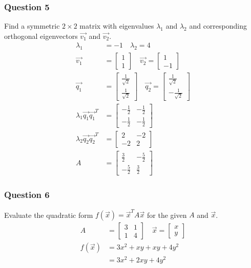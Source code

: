 \documentclass{math}
\begin{document}
\subsubsection*{Question 5}
Find a symmetric \( 2\times2 \) matrix with eigenvalues \( \lambda_1 \) and
\( \lambda_2 \) and corresponding orthogonal eigenvectors \( \vec{v_1} \) and
\( \vec{v_2} \).
\begin{align*}
  \lambda_1 &= -1 \quad \lambda_2 = 4 \\
  \vec{v_1} &= \begin{bmatrix}1 \\ 1\end{bmatrix} \quad
    \vec{v_2} = \begin{bmatrix}1 \\ -1\end{bmatrix} \\
  \vec{q_1} &= \begin{bmatrix}
    \frac{1}{\sqrt{2}} \\ \frac{1}{\sqrt{2}}
  \end{bmatrix} \quad \vec{q_2} = \begin{bmatrix}
    \frac{1}{\sqrt{2}} \\ -\frac{1}{\sqrt{2}}
  \end{bmatrix} \\
  \lambda_1\vec{q_1}\vec{q_1}^T &= \begin{bmatrix}
    -\frac{1}{2} & -\frac{1}{2} \\ -\frac{1}{2} & -\frac{1}{2}
  \end{bmatrix} \\
  \lambda_2\vec{q_2}\vec{q_2}^T &= \begin{bmatrix}
    2 & -2 \\ -2 & 2
  \end{bmatrix} \\
  A &= \begin{bmatrix}
    \frac{3}{2} & -\frac{5}{2} \\ -\frac{5}{2} & \frac{3}{2}
  \end{bmatrix}
\end{align*}

\subsubsection*{Question 6}
Evaluate the quadratic form \( f(\vec{x}) = \vec{x}^TA\vec{x} \) for the given
\( A \) and \( \vec{x} \).
\begin{align*}
  A &= \begin{bmatrix}3 & 1 \\ 1 & 4\end{bmatrix} \quad
    \vec{x} = \begin{bmatrix}x \\ y\end{bmatrix} \\
  f(\vec{x}) &= 3x^2+xy+xy+4y^2 \\
  &= 3x^2+2xy+4y^2
\end{align*}
\end{document}
